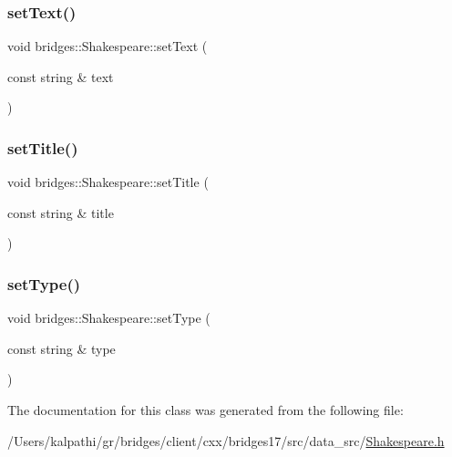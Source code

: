 \mbox{\label{classbridges_1_1_shakespeare_a220546925748e67c238411f1ee04d393}} 
\subsubsection{\texorpdfstring{set\+Text()}{setText()}}
{\footnotesize\ttfamily void bridges\+::\+Shakespeare\+::set\+Text (\begin{DoxyParamCaption}\item[{const string \&}]{text }\end{DoxyParamCaption})\hspace{0.3cm}{\ttfamily [inline]}}

\mbox{\label{classbridges_1_1_shakespeare_ad68bee03f37d3fae7ffa4c75946a6dfd}} 
\subsubsection{\texorpdfstring{set\+Title()}{setTitle()}}
{\footnotesize\ttfamily void bridges\+::\+Shakespeare\+::set\+Title (\begin{DoxyParamCaption}\item[{const string \&}]{title }\end{DoxyParamCaption})\hspace{0.3cm}{\ttfamily [inline]}}

\mbox{\label{classbridges_1_1_shakespeare_a683816de184cf1e999552e82bcbefa21}} 
\subsubsection{\texorpdfstring{set\+Type()}{setType()}}
{\footnotesize\ttfamily void bridges\+::\+Shakespeare\+::set\+Type (\begin{DoxyParamCaption}\item[{const string \&}]{type }\end{DoxyParamCaption})\hspace{0.3cm}{\ttfamily [inline]}}



The documentation for this class was generated from the following file\+:\begin{DoxyCompactItemize}
\item 
/\+Users/kalpathi/gr/bridges/client/cxx/bridges17/src/data\+\_\+src/\mbox{\hyperlink{_shakespeare_8h}{Shakespeare.\+h}}\end{DoxyCompactItemize}
